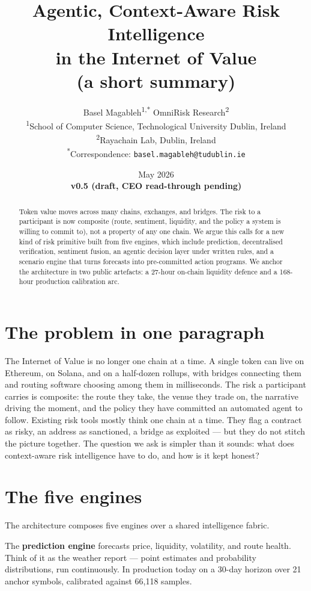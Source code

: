 \documentclass[11pt,a4paper]{article}
\title{Agentic, Context-Aware Risk Intelligence\\
       in the Internet of Value\\[0.4em]
       \large{\normalfont(a short summary)}}
\author{%
  Basel Magableh\textsuperscript{1,*} \quad\quad OmniRisk Research\textsuperscript{2} \\[0.8em]
  \normalsize\textsuperscript{1}School of Computer Science, Technological University Dublin, Ireland \\
  \normalsize\textsuperscript{2}Rayachain Lab, Dublin, Ireland \\[0.4em]
  \normalsize\textsuperscript{*}Correspondence: \texttt{basel.magableh@tudublin.ie}
}
\date{May 2026 \\ \textbf{v0.5 (draft, CEO read-through pending)}}
\begin{document}
\maketitle

\begin{abstract}
Token value moves across many chains, exchanges, and bridges. The risk
to a participant is now composite (route, sentiment, liquidity, and the
policy a system is willing to commit to), not a property of any one
chain. We argue this calls for a new kind of risk primitive built from
five engines, which include prediction, decentralised verification,
sentiment fusion, an agentic decision layer under written rules, and a
scenario engine that turns forecasts into pre-committed action programs.
We anchor the architecture in two public artefacts: a 27-hour on-chain
liquidity defence and a 168-hour production calibration arc.
\end{abstract}

\section*{The problem in one paragraph}

The Internet of Value is no longer one chain at a time. A single token
can live on Ethereum, on Solana, and on a half-dozen rollups, with
bridges connecting them and routing software choosing among them in
milliseconds. The risk a participant carries is composite: the route
they take, the venue they trade on, the narrative driving the moment,
and the policy they have committed an automated agent to follow.
Existing risk tools mostly think one chain at a time. They flag a
contract as risky, an address as sanctioned, a bridge as exploited ---
but they do not stitch the picture together. The question we ask is
simpler than it sounds: what does context-aware risk intelligence have
to do, and how is it kept honest?

\section*{The five engines}

The architecture composes five engines over a shared intelligence
fabric.

The \textbf{prediction engine} forecasts price, liquidity, volatility,
and route health. Think of it as the weather report --- point estimates
and probability distributions, run continuously. In production today on
a 30-day horizon over 21 anchor symbols, calibrated against 66{,}118
samples.
\end{document}
